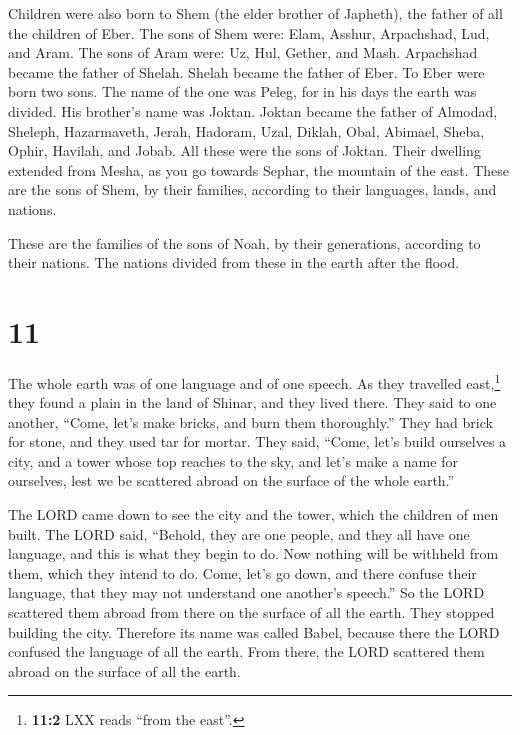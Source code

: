  Children were also born to Shem (the elder brother of
Japheth), the father of all the children of Eber.  The
sons of Shem were: Elam, Asshur, Arpachshad, Lud, and Aram.
 The sons of Aram were: Uz, Hul, Gether, and Mash.
 Arpachshad became the father of Shelah. Shelah became
the father of Eber.  To Eber were born two sons. The name
of the one was Peleg, for in his days the earth was divided. His
brother's name was Joktan.  Joktan became the father of
Almodad, Sheleph, Hazarmaveth, Jerah,  Hadoram, Uzal,
Diklah,  Obal, Abimael, Sheba,  Ophir,
Havilah, and Jobab. All these were the sons of Joktan. 
Their dwelling extended from Mesha, as you go towards Sephar, the
mountain of the east.  These are the sons of Shem, by
their families, according to their languages, lands, and nations.

 These are the families of the sons of Noah, by their
generations, according to their nations. The nations divided from these
in the earth after the flood.

\hypertarget{section-10}{%
\section{11}\label{section-10}}

 The whole earth was of one language and of one speech.
 As they travelled east,\footnote{\textbf{11:2} LXX reads
  ``from the east''.} they found a plain in the land of Shinar, and they
lived there.  They said to one another, ``Come, let's make
bricks, and burn them thoroughly.'' They had brick for stone, and they
used tar for mortar.  They said, ``Come, let's build
ourselves a city, and a tower whose top reaches to the sky, and let's
make a name for ourselves, lest we be scattered abroad on the surface of
the whole earth.''

 The LORD came down to see the city and the tower, which
the children of men built.  The LORD said, ``Behold, they
are one people, and they all have one language, and this is what they
begin to do. Now nothing will be withheld from them, which they intend
to do.  Come, let's go down, and there confuse their
language, that they may not understand one another's speech.''
 So the LORD scattered them abroad from there on the
surface of all the earth. They stopped building the city. 
Therefore its name was called Babel, because there the LORD confused the
language of all the earth. From there, the LORD scattered them abroad on
the surface of all the earth.

